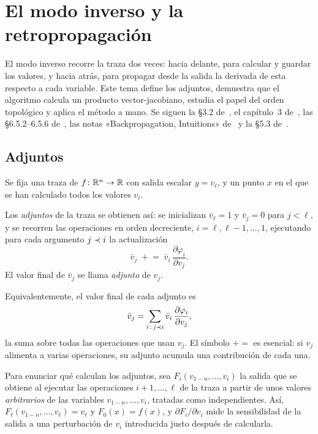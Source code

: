 \chapter{El modo inverso y la retropropagación}
\label{tema:3}

El modo inverso recorre la traza dos veces: hacia delante, para calcular y guardar los valores, y hacia atrás, para propagar desde la salida la derivada de esta respecto a cada variable. Este tema define los adjuntos, demuestra que el algoritmo calcula un producto vector-jacobiano, estudia el papel del orden topológico y aplica el método a mano. Se siguen la §3.2 de~\cite{baydin}, el capítulo~3 de~\cite{gw}, las §6.5.2--6.5.6 de~\cite{gbc}, las notas «Backpropagation, Intuitions» de~\cite{cs231n} y la §5.3 de~\cite{d2l}.

\section{Adjuntos}

Se fija una traza de $f\colon\mathbb{R}^{n}\to\mathbb{R}$ con salida escalar $y=v_\ell$, y un punto $x$ en el que se han calculado todos los valores $v_i$.

\begin{definicion}[Adjuntos]\label{def:adjunto}
Los \emph{adjuntos} de la traza se obtienen así: se inicializan $\bar v_\ell=1$ y $\bar v_j=0$ para $j<\ell$, y se recorren las operaciones en orden decreciente, $i=\ell,\ell-1,\dots,1$, ejecutando para cada argumento $j\prec i$ la actualización
\[
\bar v_j\;\mathrel{+}=\;\bar v_i\,\frac{\partial\varphi_i}{\partial v_j}.
\]
El valor final de $\bar v_j$ se llama \emph{adjunto} de $v_j$.
\end{definicion}

Equivalentemente, el valor final de cada adjunto es
\[
\bar v_j=\sum_{i\,:\,j\prec i}\bar v_i\,\frac{\partial\varphi_i}{\partial v_j},
\]
la suma sobre todas las operaciones que usan $v_j$. El símbolo $\mathrel{+}=$ es esencial: si $v_j$ alimenta a varias operaciones, su adjunto acumula una contribución de cada una.

Para enunciar qué calculan los adjuntos, sea $F_i(v_{1-n},\dots,v_i)$ la salida que se obtiene al ejecutar las operaciones $i+1,\dots,\ell$ de la traza a partir de unos valores \emph{arbitrarios} de las variables $v_{1-n},\dots,v_i$, tratadas como independientes. Así, $F_\ell(v_{1-n},\dots,v_\ell)=v_\ell$ y $F_0(x)=f(x)$, y $\partial F_i/\partial v_i$ mide la sensibilidad de la salida a una perturbación de $v_i$ introducida justo después de calcularla.

